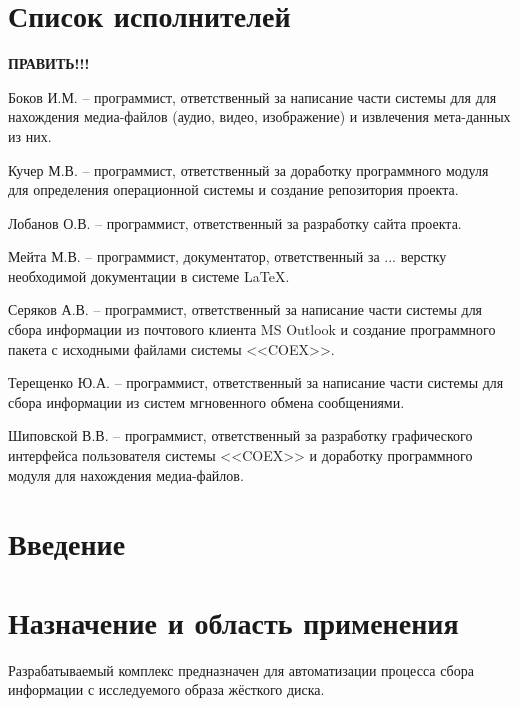 


 
 
 
 \newpage
 \section*{Список исполнителей}
 
 \textbf{ПРАВИТЬ!!!}

Боков И.М. -- программист, ответственный за написание части системы для для нахождения медиа-файлов (аудио, видео, изображение) и извлечения мета-данных из них.
 
Кучер М.В. -- программист, ответственный за доработку программного модуля для определения операционной системы и создание репозитория проекта.
 
Лобанов О.В. -- программист, ответственный за разработку сайта проекта. 

Мейта М.В. -- программист, документатор, ответственный за ... верстку необходимой документации в системе \LaTeX.

Серяков А.В. -- программист, ответственный за написание части системы для сбора информации из почтового клиента MS Outlook и создание программного пакета с исходными файлами системы <<COEX>>.

Терещенко Ю.А. -- программист, ответственный за написание части системы для сбора информации из систем мгновенного обмена сообщениями.

Шиповской В.В. -- программист, ответственный за разработку графического интерфейса пользователя системы <<COEX>> и доработку программного модуля для нахождения медиа-файлов.




 
 \newpage
 \tableofcontents

 \newpage
 \section*{Введение}
 

 \section{Назначение и область применения}
Разрабатываемый комплекс предназначен для автоматизации процесса сбора информации с исследуемого образа жёсткого диска.

